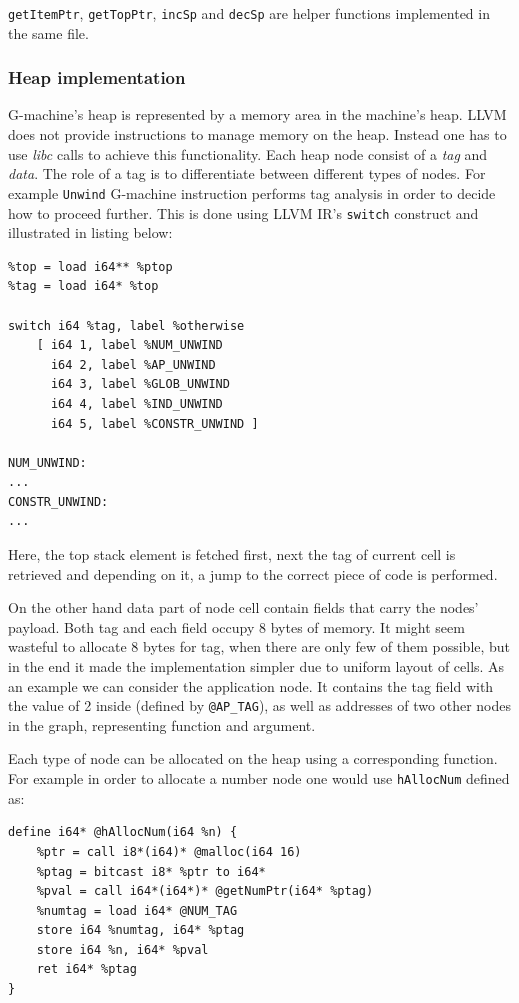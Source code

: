 \documentclass[12pt,a4paper]{report}
\begin{document}
\texttt{getItemPtr}, \texttt{getTopPtr}, \texttt{incSp} and \texttt{decSp} are
helper functions implemented in the same file.


\subsubsection{Heap implementation}
G-machine's heap is represented by a memory area in the machine's heap. LLVM
does not provide instructions to manage memory on the heap. Instead one has to
use \textit{libc} calls to achieve this functionality. Each heap node consist
of a \textit{tag} and \textit{data}. The role of a tag is to differentiate
between different types of nodes. For example \texttt{Unwind} G-machine
instruction performs tag analysis in order to decide how to proceed further.
This is done using LLVM IR's \texttt{switch} construct and illustrated in
listing below:

\vspace*{0.2in}
\begin{lstlisting}[style=assembler]
%ptop = call i64**()* @getTopPtr()
%top = load i64** %ptop
%tag = load i64* %top

switch i64 %tag, label %otherwise
    [ i64 1, label %NUM_UNWIND
      i64 2, label %AP_UNWIND
      i64 3, label %GLOB_UNWIND
      i64 4, label %IND_UNWIND
      i64 5, label %CONSTR_UNWIND ]

NUM_UNWIND:
...
CONSTR_UNWIND:
...
\end{lstlisting}
Here, the top stack element is fetched first, next the tag of current cell is
retrieved and depending on it, a jump to the correct piece of code is
performed.

On the other hand data part of node cell contain fields that carry the nodes'
payload. Both tag and each field occupy 8 bytes of memory. It might seem
wasteful to allocate 8 bytes for tag, when there are only few of them possible,
but in the end it made the implementation simpler due to uniform layout of
cells. As an example we can consider the application node. It contains the tag
field with the value of 2 inside (defined by \texttt{@AP\_TAG}), as well as
addresses of two other nodes in the graph, representing function and argument.

Each type of node can be allocated on the heap using a corresponding function.
For example in order to allocate a number node one would use \texttt{hAllocNum}
defined as:

\vspace*{0.2in}
\begin{lstlisting}[style=assembler,caption={Definition of function allocating number node on
  the heap.}]
define i64* @hAllocNum(i64 %n) {
    %ptr = call i8*(i64)* @malloc(i64 16)
    %ptag = bitcast i8* %ptr to i64*
    %pval = call i64*(i64*)* @getNumPtr(i64* %ptag)
    %numtag = load i64* @NUM_TAG
    store i64 %numtag, i64* %ptag
    store i64 %n, i64* %pval
    ret i64* %ptag
}
\end{lstlisting}
\end{document}
